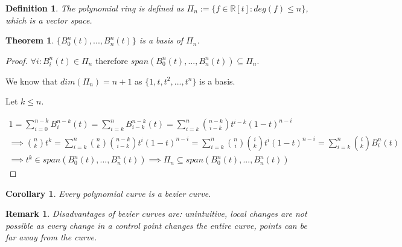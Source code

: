 \documentclass[]{article}
\newtheorem{theorem}{Theorem}
\newtheorem{definition}{Definition}
\newtheorem{remark}{Remark}
\newtheorem{corollary}{Corollary}
\begin{document}
\begin{definition}
	The polynomial ring is defined as $\Pi_n := \{f \in \mathbb{R}[t] : deg(f) \leq n\}$, which is a vector space.
\end{definition}

\begin{theorem}
	$\{B_0^n(t), ..., B_n^n(t)\}$ is a basis of $\Pi_n$.
\end{theorem}

\begin{proof}
	$\forall i: B_i^n(t) \in \Pi_n$ therefore $span(B_0^n(t), ..., B_n^n(t)) \subseteq \Pi_n$.
	
	We know that $dim(\Pi_n) = n+1$ as $\{1, t, t^2, ..., t^n\}$ is a basis.
	
	Let $k \leq n$.
	
	\begin{align*}
		1 = \sum_{i=0}^{n-k} B_i^{n-k}(t) = \sum_{i=k}^{n} B_{i-k}^{n-k}(t) = \sum_{i=k}^{n} \binom{n-k}{i-k} t^{i-k} (1-t)^{n-i}\\
		\implies \binom{n}{k} t^k = \sum_{i=k}^{n} \binom{n}{k} \binom{n-k}{i-k} t^i (1-t)^{n-i} = \sum_{i=k}^{n} \binom{n}{i} \binom{i}{k} t^i (1-t)^{n-i} = \sum_{i=k}^{n} \binom{i}{k} B_i^n(t)\\
		\implies t^k \in span(B_0^n(t), ..., B_n^n(t)) \implies \Pi_n \subseteq span(B_0^n(t), ..., B_n^n(t))
	\end{align*}
\end{proof}

\begin{corollary}
	Every polynomial curve is a bezier curve.
\end{corollary}

\begin{remark}
	Disadvantages of bezier curves are: unintuitive, local changes are not possible as every change in a control point changes the entire curve, points can be far away from the curve.
\end{remark}
\end{document}
